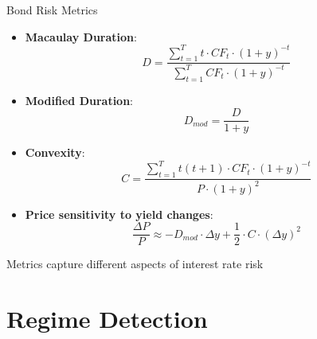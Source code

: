 \documentclass{beamer}
\begin{document}
\begin{frame}{Bond Risk Metrics}
\begin{itemize}
    \item \textbf{Macaulay Duration}:
    \begin{equation}
    D = \frac{\sum_{t=1}^{T} t \cdot CF_t \cdot (1+y)^{-t}}{\sum_{t=1}^{T} CF_t \cdot (1+y)^{-t}}
    \end{equation}
    
    \item \textbf{Modified Duration}:
    \begin{equation}
    D_{mod} = \frac{D}{1+y}
    \end{equation}
    
    \item \textbf{Convexity}:
    \begin{equation}
    C = \frac{\sum_{t=1}^{T} t(t+1) \cdot CF_t \cdot (1+y)^{-t}}{P \cdot (1+y)^2}
    \end{equation}
    
    \item \textbf{Price sensitivity to yield changes}:
    \begin{equation}
    \frac{\Delta P}{P} \approx -D_{mod} \cdot \Delta y + \frac{1}{2} \cdot C \cdot (\Delta y)^2
    \end{equation}
\end{itemize}
Metrics capture different aspects of interest rate risk
\end{frame}

\section{Regime Detection}
\end{document}
